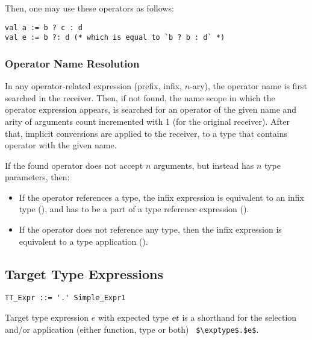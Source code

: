 Then, one may use these operators as follows: 

\begin{lstlisting}
val a := b ? c : d
val e := b ?: d (* which is equal to `b ? b : d` *)
\end{lstlisting}





\subsubsection{Operator Name Resolution}

In any operator-related expression (prefix, infix, $n$-ary), the operator name is first searched in the receiver. Then, if not found, the name scope in which the operator expression appears, is searched for an operator of the given name and arity of arguments count incremented with 1 (for the original receiver). After that, implicit conversions are applied to the receiver, to a type that contains operator with the given name. 

If the found operator does not accept $n$ arguments, but instead has $n$ type parameters, then:
\begin{itemize} 
  \item If the operator references a type, the infix expression is equivalent to an infix type (), and has to be a part of a type reference expression (). 
  \item If the operator does not reference any type, then the infix expression is equivalent to a type application (). 
\end{itemize}





\subsection{Target Type Expressions}
\label{sec:target-type-expressions}

\syntax\begin{lstlisting}
TT_Expr ::= '.' Simple_Expr1
\end{lstlisting}

Target type expression $e$ with expected type $\mbox{\sl et}$ is a shorthand for the selection and/or application (either function, type or both) ~\lstinline!$\exptype$.$e$!. 

